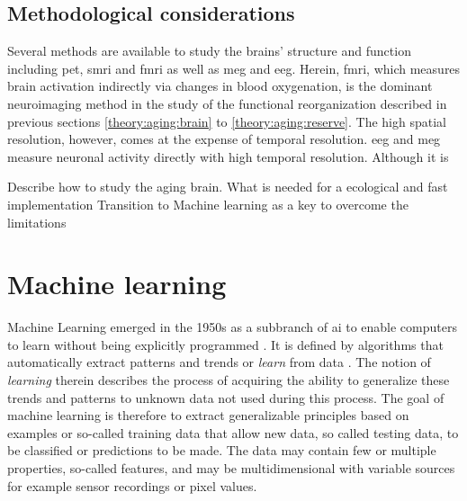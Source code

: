 \subsection{Methodological considerations}
Several methods are available to study the brains' structure and function including \gls{pet}, \gls{smri} and \gls{fmri} as well as \gls{meg} and \gls{eeg}. Herein, \Gls{fmri}, which measures brain activation indirectly via changes in blood oxygenation, is the dominant neuroimaging method in the study of the functional reorganization described in previous sections \ref{theory:aging:brain} to \ref{theory:aging:reserve}. The high spatial resolution, however, comes at the expense of temporal resolution. \Gls{eeg} and \gls{meg} measure neuronal activity directly with high temporal resolution. Although it is  

Describe how to study the aging brain. 
What is needed for a ecological and fast implementation 
Transition to Machine learning as a key to overcome the limitations

\section{Machine learning}
\label{theory:ML}
Machine Learning emerged in the 1950s as a subbranch of \gls{ai} to enable computers to learn without being explicitly programmed \cite{Samual1959}. It is defined by algorithms that automatically extract patterns and trends or \textit{learn} from data \cite{Hastie2009}. The notion of \textit{learning} therein describes the process of acquiring the ability to generalize these trends and patterns to unknown data not used during this process. The goal of machine learning is therefore to extract generalizable principles based on examples or so-called training data that allow new data, so called testing data, to be classified or predictions to be made. The data may contain few or multiple properties, so-called features, and may be multidimensional with variable sources for example sensor recordings or pixel values.

